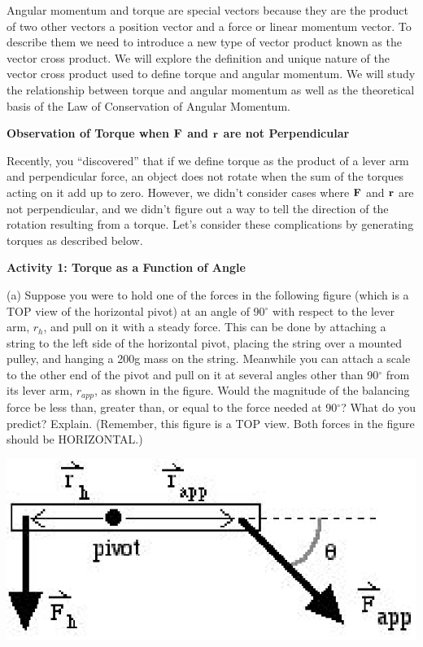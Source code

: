 Angular momentum and torque are special vectors because they are the product
of two other vectors a position vector and a force or linear momentum vector.
To describe them we need to introduce a new type of vector product known as
the vector cross product. We will explore the definition and unique nature of
the vector cross product used to define torque and angular momentum. We will
study the relationship between torque and angular momentum as well as the theoretical
basis of the Law of Conservation of Angular Momentum.

\textbf{Observation of Torque when \( {\bf F} \) and \( {\bf r} \)
are not Perpendicular} 

Recently, you ``discovered'' that if we define torque as the
product of a lever arm and perpendicular force, an object does not rotate when
the sum of the torques acting on it add up to zero. However, we didn't consider
cases where \textbf{\( {\bf F} \)} and \textbf{\( {\bf r} \)}
are not perpendicular, and we didn't figure out a way to tell the direction
of the rotation resulting from a torque. Let's consider these complications
by generating torques as described below.

\textbf{Activity 1: Torque as a Function of Angle} 

(a) Suppose you were to hold one of the forces in the following figure (which is a TOP view of the horizontal pivot) at an angle of 90\( ^{\circ } \)
with respect to the lever arm, \( r_{h} \), and pull on it with a steady force.
This can be done by attaching a string to the left side of the horizontal pivot, placing the string over a mounted pulley, and hanging a 200g mass on the string. Meanwhile you can attach a scale to the other end of the pivot and pull on it at several angles other than 90\( ^{\circ } \)
from its lever arm, \( r_{app} \), as shown in the figure. Would the magnitude of the balancing force be less than, greater than, or equal to the force needed at 90\( ^{\circ } \)? What do you predict? Explain. (Remember, this figure is a TOP view. Both forces in the figure should be HORIZONTAL.)

\vspace{0.3cm}
{\par\raggedright \includegraphics{ang_mom_fig1.eps} \par}
\vspace{0.3cm}

